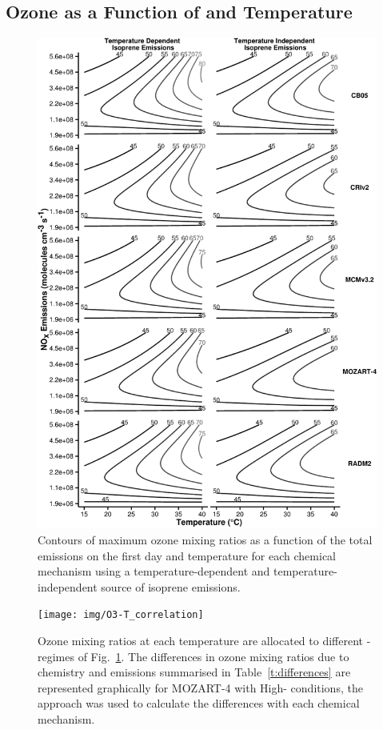 \subsection[Ozone as a Function of NOx and Temperature]{Ozone as a Function of  and Temperature} \label{ss:r_contours}

\begin{figure}%
    \centering%
    \caption{Contours of maximum ozone mixing ratios as a function of the total  emissions on the first day and temperature for each chemical mechanism using a temperature-dependent and temperature-independent source of isoprene emissions.}
    \label{f:ozone_contours}%
    \includegraphics[width=\textwidth]{img/O3_comparison}%
\end{figure}

\begin{figure}[t]%
    \centering%
    \caption{Ozone mixing ratios at each temperature are allocated to different -regimes of Fig.~\ref{f:ozone_contours}. The differences in ozone mixing ratios due to chemistry and emissions summarised in Table~\ref{t:differences} are represented graphically for MOZART-4 with High- conditions, the approach was used to calculate the differences with each chemical mechanism.}%
    \label{f:O3-T}%
    \texttt{[image: img/O3-T\_correlation]}%
\end{figure}

